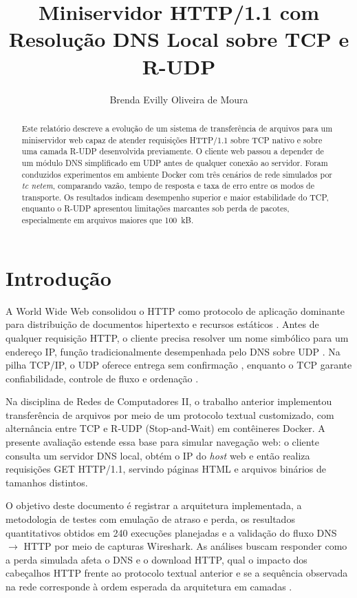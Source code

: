 \documentclass[12pt]{article}
\title{Miniservidor HTTP/1.1 com Resolução DNS Local sobre TCP e R-UDP}
\author{Brenda Evilly Oliveira de Moura}
\begin{document}
\maketitle

\begin{abstract}
  Este relatório descreve a evolução de um sistema de transferência de arquivos
  para um miniservidor web capaz de atender requisições HTTP/1.1 sobre TCP nativo
  e sobre uma camada R-UDP desenvolvida previamente. O cliente web passou a
  depender de um módulo DNS simplificado em UDP antes de qualquer conexão ao
  servidor. Foram conduzidos experimentos em ambiente Docker com três cenários
  de rede simulados por \emph{tc netem}, comparando vazão, tempo de resposta e
  taxa de erro entre os modos de transporte. Os resultados indicam desempenho
  superior e maior estabilidade do TCP, enquanto o R-UDP apresentou limitações
  marcantes sob perda de pacotes, especialmente em arquivos maiores que 100~kB.
\end{abstract}

\section{Introdução}

A World Wide Web consolidou o HTTP como protocolo de aplicação dominante para
distribuição de documentos hipertexto e recursos estáticos \cite{rfc2616,rfc9110}.
Antes de qualquer requisição HTTP, o cliente precisa resolver um nome simbólico
para um endereço IP, função tradicionalmente desempenhada pelo DNS sobre UDP
\cite{rfc1035}. Na pilha TCP/IP, o UDP oferece entrega sem confirmação
\cite{rfc768}, enquanto o TCP garante confiabilidade, controle de fluxo e
ordenação \cite{rfc793,tanenbaum2011}.

Na disciplina de Redes de Computadores II, o trabalho anterior implementou
transferência de arquivos por meio de um protocolo textual customizado, com
alternância entre TCP e R-UDP (Stop-and-Wait) em contêineres Docker. A presente
avaliação estende essa base para simular navegação web: o cliente consulta um
servidor DNS local, obtém o IP do \emph{host} web e então realiza requisições
GET HTTP/1.1, servindo páginas HTML e arquivos binários de tamanhos distintos.

O objetivo deste documento é registrar a arquitetura implementada, a metodologia
de testes com emulação de atraso e perda, os resultados quantitativos obtidos
em 240 execuções planejadas e a validação do fluxo DNS $\rightarrow$ HTTP por
meio de capturas Wireshark. As análises buscam responder como a perda simulada
afeta o DNS e o download HTTP, qual o impacto dos cabeçalhos HTTP frente ao
protocolo textual anterior e se a sequência observada na rede corresponde à
ordem esperada da arquitetura em camadas \cite{kurose2017,carpenter2010}.
\end{document}

